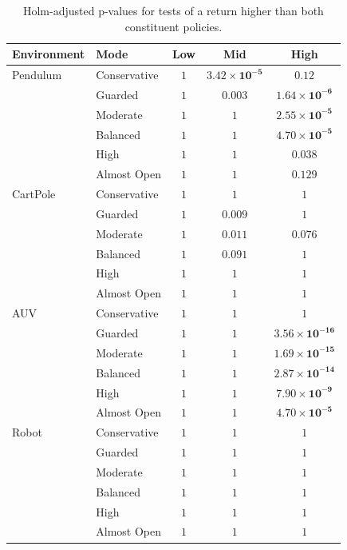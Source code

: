 \begin{table}[t]
  \centering
  \caption{Holm-adjusted p-values for tests of a return higher than
    both constituent policies.}
  \label{tab:intersection_union_p_values}
  \scriptsize
  \begin{tabular}{llccc}
    \toprule
    Environment & Mode & Low & Mid & High \\
    \midrule
    Pendulum & Conservative & $1$ & $\mathbf{3.42\times10^{-5}}$ & $0.12$ \\
     & Guarded & $1$ & $\mathbf{0.003}$ & $\mathbf{1.64\times10^{-6}}$ \\
     & Moderate & $1$ & $1$ & $\mathbf{2.55\times10^{-5}}$ \\
     & Balanced & $1$ & $1$ & $\mathbf{4.70\times10^{-5}}$ \\
     & High & $1$ & $1$ & $\mathbf{0.038}$ \\
     & Almost Open & $1$ & $1$ & $0.129$ \\
    \midrule
    CartPole & Conservative & $1$ & $1$ & $1$ \\
     & Guarded & $1$ & $\mathbf{0.009}$ & $1$ \\
     & Moderate & $1$ & $\mathbf{0.011}$ & $0.076$ \\
     & Balanced & $1$ & $0.091$ & $1$ \\
     & High & $1$ & $1$ & $1$ \\
     & Almost Open & $1$ & $1$ & $1$ \\
    \midrule
    AUV & Conservative & $1$ & $1$ & $1$ \\
     & Guarded & $1$ & $1$ & $\mathbf{3.56\times10^{-16}}$ \\
     & Moderate & $1$ & $1$ & $\mathbf{1.69\times10^{-15}}$ \\
     & Balanced & $1$ & $1$ & $\mathbf{2.87\times10^{-14}}$ \\
     & High & $1$ & $1$ & $\mathbf{7.90\times10^{-9}}$ \\
     & Almost Open & $1$ & $1$ & $\mathbf{4.70\times10^{-5}}$ \\
    \midrule
    Robot & Conservative & $1$ & $1$ & $1$ \\
     & Guarded & $1$ & $1$ & $1$ \\
     & Moderate & $1$ & $1$ & $1$ \\
     & Balanced & $1$ & $1$ & $1$ \\
     & High & $1$ & $1$ & $1$ \\
     & Almost Open & $1$ & $1$ & $1$ \\
    \bottomrule
  \end{tabular}
\end{table}
